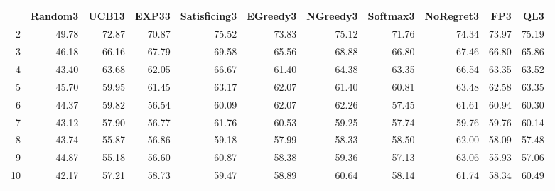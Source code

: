 \begin{table}[ht]
\centering
\begin{tabular}{rrrrrrrrrrr}
  \hline
 & Random3 & UCB13 & EXP33 & Satisficing3 & EGreedy3 & NGreedy3 & Softmax3 & NoRegret3 & FP3 & QL3 \\ 
  \hline
2 & 49.78 & 72.87 & 70.87 & 75.52 & 73.83 & 75.12 & 71.76 & 74.34 & 73.97 & 75.19 \\ 
  3 & 46.18 & 66.16 & 67.79 & 69.58 & 65.56 & 68.88 & 66.80 & 67.46 & 66.80 & 65.86 \\ 
  4 & 43.40 & 63.68 & 62.05 & 66.67 & 61.40 & 64.38 & 63.35 & 66.54 & 63.35 & 63.52 \\ 
  5 & 45.70 & 59.95 & 61.45 & 63.17 & 62.07 & 61.40 & 60.81 & 63.48 & 62.58 & 63.35 \\ 
  6 & 44.37 & 59.82 & 56.54 & 60.09 & 62.07 & 62.26 & 57.45 & 61.61 & 60.94 & 60.30 \\ 
  7 & 43.12 & 57.90 & 56.77 & 61.76 & 60.53 & 59.25 & 57.74 & 59.76 & 59.76 & 60.14 \\ 
  8 & 43.74 & 55.87 & 56.86 & 59.18 & 57.99 & 58.33 & 58.50 & 62.00 & 58.09 & 57.48 \\ 
  9 & 44.87 & 55.18 & 56.60 & 60.87 & 58.38 & 59.36 & 57.13 & 63.06 & 55.93 & 57.06 \\ 
  10 & 42.17 & 57.21 & 58.73 & 59.47 & 58.89 & 60.64 & 58.14 & 61.74 & 58.34 & 60.49 \\ 
   \hline
\end{tabular}
\end{table}

